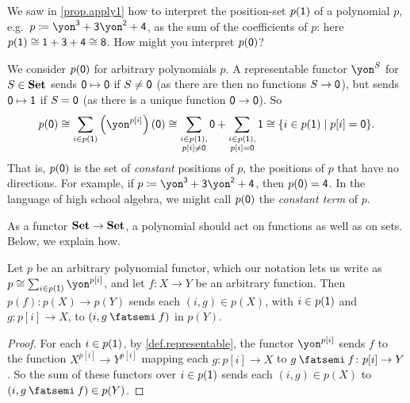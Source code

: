 \documentclass[Book-Poly]{subfiles}
\begin{document}
\begin{exercise}\label{exc.apply0}
    We saw in \cref{prop.apply1} how to interpret the position-set $p(\textsf{1})$ of a polynomial $p$, e.g.\ $p\coloneqq\yon^\3+\3\yon^\2+\4$, as the sum of the coefficients of $p$: here $p(\textsf{1})\cong\textsf{1}+\textsf{3}+\textsf{4}\cong\textsf{8}$.
    How might you interpret $p(\textsf{0})$?
    \begin{solution}
        We consider $p(\textsf{0})$ for arbitrary polynomials $p$.
        A representable functor $\yon^S$ for $S\in\mathbf{Set}$ sends $\textsf{0}\mapsto\textsf{0}$ if $S\neq\textsf{0}$ (as there are then no functions $S\to\textsf{0}$), but sends $\textsf{0}\mapsto\textsf{1}$ if $S=\textsf{0}$ (as there is a unique function $\textsf{0}\to\textsf{0}$).
        So
        \[
        p(\0)\iso\sum_{i\in p(\1)}\left(\yon^{p[i]}\right)(\0)\iso\sum_{\substack{i\in p(\1),\\ p[i]\neq\0}}\0+\sum_{\substack{i\in p(\1),\\ p[i]=\0}}\1\iso\{i\in p(\1)\mid p[i]=\0\}.
        \]
        That is, $p(\textsf{0})$ is the set of \emph{constant} positions of $p$, the positions of $p$ that have no directions.
        For example, if $p\coloneqq\yon^\3+\3\yon^\2+\4$, then $p(\textsf{0})=\textsf{4}$.
        In the language of high school algebra, we might call $p(\textsf{0})$ the \emph{constant term} of $p$.
    \end{solution}
\end{exercise}

As a functor $\mathbf{Set}\to\mathbf{Set}$, a polynomial should act on functions as well as on sets.
Below, we explain how.


\begin{proposition} \label{prop.poly_on_functions}
    Let $p$ be an arbitrary polynomial functor, which our notation lets us write as $p\iso\sum_{i\in p(\1)} \yon^{p[i]}$, and let $f\colon X\to Y$ be an arbitrary function.
    Then $p(f)\colon p(X)\to p(Y)$ sends each $(i, g)\in p(X)$, with $i\in p(\textsf{1})$ and $g\colon p[i]\to X$, to $(i, g\then f)$ in $p(Y)$.
\end{proposition}
\begin{proof}
    For each $i\in p(\textsf{1})$, by \cref{def.representable}, the functor $\yon^{p[i]}$ sends $f$ to the function $X^{p[i]}\to Y^{p[i]}$ mapping each $g\colon p[i]\to X$ to $g\then f\colon p[i]\to Y$.
    So the sum of these functors over $i\in p(\textsf{1})$ sends each $(i, g)\in p(X)$ to $(i, g\then f)\in p(Y)$.
\end{proof}
\end{document}
